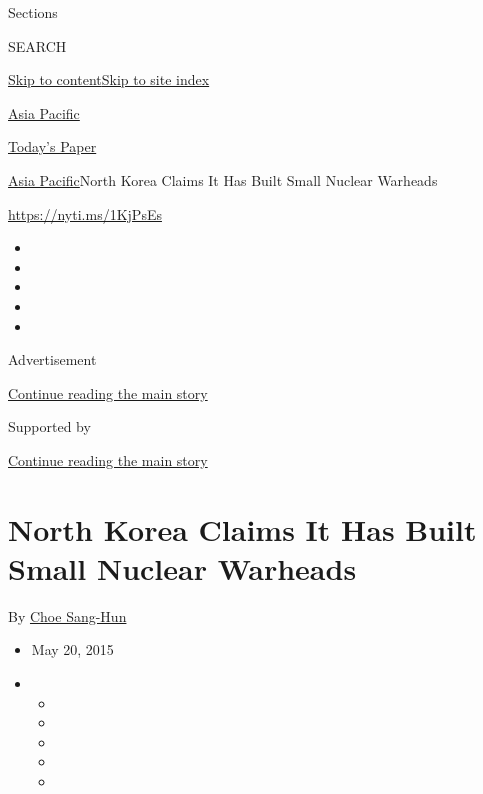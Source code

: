 Sections

SEARCH

\protect\hyperlink{site-content}{Skip to
content}\protect\hyperlink{site-index}{Skip to site index}

\href{https://www.nytimes3xbfgragh.onion/section/world/asia}{Asia
Pacific}

\href{https://myaccount.nytimes3xbfgragh.onion/auth/login?response_type=cookie\&client_id=vi}{}

\href{https://www.nytimes3xbfgragh.onion/section/todayspaper}{Today's
Paper}

\href{/section/world/asia}{Asia Pacific}\textbar{}North Korea Claims It
Has Built Small Nuclear Warheads

\url{https://nyti.ms/1KjPsEs}

\begin{itemize}
\item
\item
\item
\item
\item
\end{itemize}

Advertisement

\protect\hyperlink{after-top}{Continue reading the main story}

Supported by

\protect\hyperlink{after-sponsor}{Continue reading the main story}

\hypertarget{north-korea-claims-it-has-built-small-nuclear-warheads}{%
\section{North Korea Claims It Has Built Small Nuclear
Warheads}\label{north-korea-claims-it-has-built-small-nuclear-warheads}}

By \href{http://www.nytimes3xbfgragh.onion/by/choe-sang-hun}{Choe
Sang-Hun}

\begin{itemize}
\item
  May 20, 2015
\item
  \begin{itemize}
  \item
  \item
  \item
  \item
  \item
  \end{itemize}
\end{itemize}


